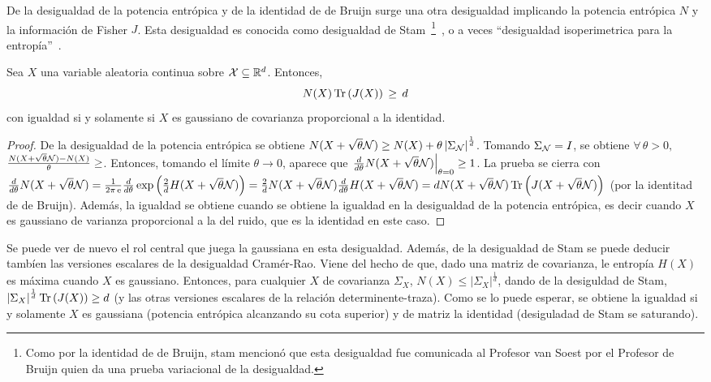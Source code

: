 De la desigualdad de la potencia entr\'opica  y de la identidad de de Bruijn surge
una otra desigualdad implicando la  potencia entr\'opica $N$ y la informaci\'on de
Fisher $J$. Esta desigualdad es conocida como desigualdad de Stam~\footnote{Como
  por  la identidad  de  de Bruijn,  stam  mencion\'o que  esta desigualdad  fue
  comunicada al Profesor van Soest por el Profesor de Bruijn quien da una prueba
  variacional  de  la desigualdad.}~\cite{CovTho06,  Rio07,  Sta59},  o a  veces
``desigualdad isoperimetrica para la entrop\'ia''~\cite{WanMad04}.
%
\begin{teorema}
  Sea   $X$    una   variable    aleatoria   continua   sobre    $\mathcal{X}   \subseteq
  \mathbb{R}^d$. Entonces,
  \[
  N(X) \operatorname{Tr}\left( J(X) \right) \, \ge \, d
  \]
  con igualdad si  y solamente si $X$ es gaussiano  de covarianza proporcional a
  la identidad.
\end{teorema}
%
\begin{proof}
  De la  desigualdad de  la potencia entr\'opica  se obtiene $N(X  + \sqrt{\theta}
  \mathcal{N})  \ge N(X)  + \theta  \left| \Sigma_{\mathcal{N}}  \right|^{\frac1d}$. Tomando
  $\Sigma_{\mathcal{N}}  = I$,  se obtiene  $\forall  \, \theta  > 0,$  \ $\frac{N(X  +
    \sqrt{\theta} \mathcal{N})  - N(X)}{\theta} \ge  $.  Entonces, tomando  el l\'imite
  $\theta  \to 0$,  aparece que  $\left. \frac{d}{d\theta}  N(X  + \sqrt{\theta}
    \mathcal{N})   \right|_{\theta  =   0}  \ge   1$.   La   prueba  se   cierra  con
  $\frac{d}{d\theta}  N(X   +  \sqrt{\theta}   \mathcal{N})  =  \frac{1}{2   \pi  \operatorname{e}}
  \frac{d}{d\theta}  \exp\left( \frac2d  H(X +  \sqrt{\theta} \mathcal{N})  \right) =
  \frac2d  N(X +  \sqrt{\theta}  \mathcal{N}) \frac{d}{d\theta}  H(X +  \sqrt{\theta}
  \mathcal{N}) = d N(X +  \sqrt{\theta} \mathcal{N}) \operatorname{Tr}\left( J(X + \sqrt{\theta} \mathcal{N})
  \right)$  (por la identitad  de de  Bruijn).  Adem\'as,  la igualdad  se obtiene
  cuando se obtiene  la igualdad en la desigualdad de  la potencia entr\'opica, es
  decir cuando $X$ es gaussiano de  varianza proporcional a la del ruido, que es
  la identidad en este caso.
\end{proof}
%
Se  puede  ver  de  nuevo  el  rol  central  que  juega  la  gaussiana  en  esta
desigualdad. Adem\'as,  de la desigualdad de  Stam se puede  deducir tamb\'ien las
versiones escalares de la desigualdad Cram\'er-Rao. Viene del hecho de que, dado
una matriz de covarianza, le entrop\'ia  $H(X)$ es m\'axima cuando $X$ es gaussiano.
Entonces, para cualquier $X$ de covarianza $\Sigma_X$, $N(X) \le \left| \Sigma_X
\right|^{\frac1d}$,   dando  de   la  desiguldad   de  Stam,   $\left|  \Sigma_X
\right|^{\frac1d} \operatorname{Tr}\left( J(X) \right) \ge d$ (y las otras versiones escalares
de la relaci\'on  determinente-traza).  Como se lo puede  esperar, se obtiene la
igualdad si y solamente $X$  es gaussiana (potencia entr\'opica alcanzando su cota
superior) y de matriz la identidad (desiguladad de Stam se saturando).

